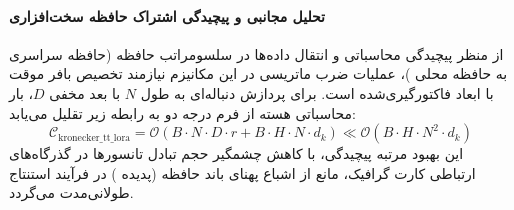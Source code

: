\paragraph{تحلیل مجانبی و پیچیدگی اشتراک حافظه سخت‌افزاری}
از منظر پیچیدگی محاسباتی و انتقال داده‌ها در سلسومراتب حافظه (حافظه سراسری  به حافظه محلی )، عملیات ضرب ماتریسی در این مکانیزم نیازمند تخصیص بافر موقت با ابعاد فاکتورگیری‌شده است. برای پردازش دنباله‌ای به طول $N$ با بعد مخفی $D$، بار محاسباتی هسته از فرم درجه دو به رابطه زیر تقلیل می‌یابد:
\begin{equation}
\label{eq:complexity_kronecker_tt_lora}
\mathcal{C}_{\text{kronecker\_tt\_lora}} = \mathcal{O}\left( B \cdot N \cdot D \cdot r + B \cdot H \cdot N \cdot d_k \right) \ll \mathcal{O}\left( B \cdot H \cdot N^2 \cdot d_k \right)
\end{equation}
این بهبود مرتبه پیچیدگی، با کاهش چشمگیر حجم تبادل تانسورها در گذرگاه‌های ارتباطی کارت گرافیک، مانع از اشباع پهنای باند حافظه (پدیده ) در فرآیند استنتاج طولانی‌مدت می‌گردد.
